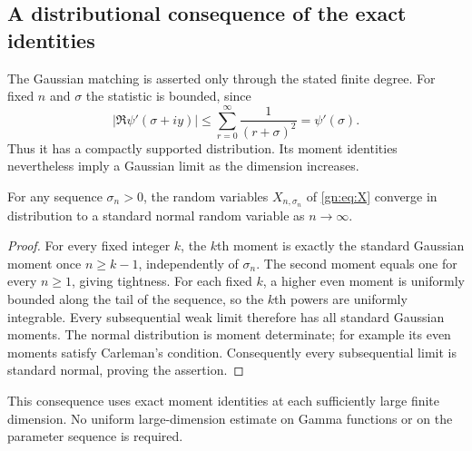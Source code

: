 \subsection{A distributional consequence of the exact identities}

The Gaussian matching is asserted only through the stated finite degree.
For fixed $n$ and $\sigma$ the statistic is bounded, since
\[
 |\Re\psi'(\sigma+iy)|\le\sum_{r=0}^\infty\frac1{(r+\sigma)^2}
                       =\psi'(\sigma).
\]
Thus it has a compactly supported distribution.  Its moment identities
nevertheless imply a Gaussian limit as the dimension increases.

\begin{corollary}
\label{gn:cor:CLT}
For any sequence $\sigma_n>0$, the random variables
$X_{n,\sigma_n}$ of \eqref{gn:eq:X} converge in distribution to a
standard normal random variable as $n\to\infty$.
\end{corollary}

\begin{proof}
For every fixed integer $k$, the $k$th moment is exactly the standard
Gaussian moment once $n\ge k-1$, independently of $\sigma_n$.
The second moment equals one for every $n\ge1$, giving tightness.
For each fixed $k$, a higher even moment is uniformly bounded along
the tail of the sequence, so the $k$th powers are uniformly integrable.
Every subsequential weak limit therefore has all standard Gaussian
moments.  The normal distribution is moment determinate; for example
its even moments satisfy Carleman's condition.  Consequently every
subsequential limit is standard normal, proving the assertion.
\end{proof}

This consequence uses exact moment identities at each sufficiently
large finite dimension.  No uniform large-dimension estimate on Gamma
functions or on the parameter sequence is required.
